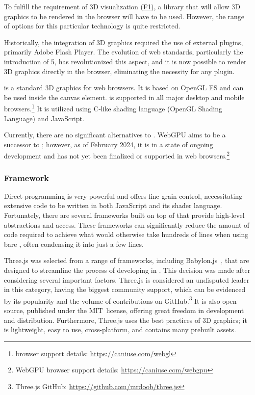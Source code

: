 To fulfill the requirement of 3D visualization (\hyperref[itm:F1]{F1}), a library that will allow 3D graphics to be rendered in the browser will have to be used. However, the range of options for this particular technology is quite restricted.

Historically, the integration of 3D graphics required the use of external plugins, primarily Adobe Flash Player. The evolution of web standards, particularly the introduction of 5, has revolutionized this aspect, and it is now possible to render 3D graphics directly in the browser, eliminating the necessity for any plugin.~\cite{Parisi2014}

 is a standard 3D graphics  for web browsers. It is based on OpenGL ES and can be used inside the  canvas element.  is supported in all major desktop and mobile browsers.\footnote{ browser support details: \url{https://caniuse.com/webgl}} It is utilized using C-like shading language (OpenGL Shading Language) and JavaScript.~\cite{Parisi2012}

Currently, there are no significant alternatives to . WebGPU aims to be a successor to ; however, as of February 2024, it is in a state of ongoing development and has not yet been finalized or supported in web browsers.\footnote{WebGPU browser support details: \url{https://caniuse.com/webgpu}}~\cite{WebGPU}


\subsubsection{ Framework} \label{section:WebGL}

Direct  programming is very powerful and offers fine-grain control, necessitating extensive code to be written in both JavaScript and its shader language. Fortunately, there are several frameworks built on top of  that provide high-level abstractions and access. These frameworks can significantly reduce the amount of code required to achieve what would otherwise take hundreds of lines when using bare , often condensing it into just a few lines.~\cite{Parisi2014}

Three.js was selected from a range of frameworks, including Babylon.js~\cite{BabylonJs}, that are designed to streamline the process of developing in . This decision was made after considering several important factors.
Three.js is considered an undisputed leader in this category, having the biggest community support, which can be evidenced by its popularity and the volume of contributions on GitHub.\footnote{Three.js GitHub: \url{https://github.com/mrdoob/three.js}} It is also open source, published under the MIT~license, offering great freedom in development and distribution. Furthermore, Three.js uses the best practices of 3D graphics; it is lightweight, easy to use, cross-platform, and contains many prebuilt assets.~\cite{ThreeJs}


